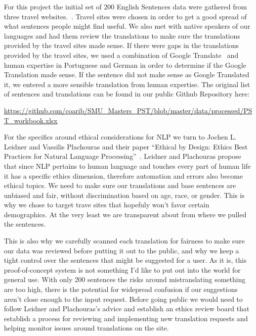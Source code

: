 \documentclass[runningheads]{llncs}
\begin{document}
For this project the initial set of 200 English Sentences data were gathered from three travel websites.~\cite{ref_url11,ref_url12,ref_url13}. Travel sites were chosen in order to get a good spread of what sentences people might find useful. We also met with native speakers of our languages and had them review the translations to make sure the translations provided by the travel sites made sense. If there were gaps in the translations provided by the travel sites, we used a combination of Google Translate~\cite{ref_url14} and human expertise in Portuguese and German in order to determine if the Google Translation made sense. If the sentence did not make sense as Google Translated it, we entered a more sensible translation from human expertise. The original list of sentences and translations can be found in our public Github Repository here:

\url{https://github.com/coarib/SMU_Masters_PST/blob/master/data/processed/PST_workbook.xlsx}

For the specifics around ethical considerations for NLP we turn to Jochen L. Leidner and Vassilis Plachouras and their paper ``Ethical by Design: Ethics Best Practices for Natural Language Processing''~\cite{ref_url15}.  Leidner and Plachouras propose that since NLP pertains to human language and touches every part of human life it has a specific ethics dimension, therefore automation and errors also become ethical topics. We need to make sure our translations and base sentences are unbiased and fair, without discrimination based on age, race, or gender. This is why we chose to target trave sites that hopefuly won't favor certain demographics. At the very least we are transparent about from where we pulled the sentences.

This is also why we carefully scanned each translation for fairness to make sure our data was reviewed before putting it out to the public, and why we keep a tight control over the sentences that might be suggested for a user. As it is, this proof-of-concept system is not something I'd like to put out into the world for general use. With only 200 sentences the risks around mistranslating something are too high, there is the potential for widepread confusion if our suggestions aren't close enough to the input request. Before going public we would need to follow Leidner and Plachouras's advice and establish an ethics review board that establish a process for reviewing and implementing new translation requests and helping monitor issues around translations on the site.
\end{document}
